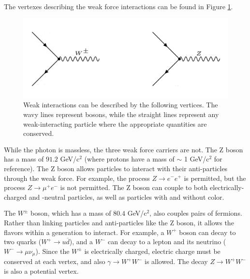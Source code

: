 The vertexes describing the weak force interactions can be found in Figure \ref{Fig:Intro:Vertex3}.
\begin{figure}[h]
    \centering
        \includegraphics[width=\textwidth]{F1/Vertex3}
        \caption{Weak interactions can be described by the following vertices. The wavy lines represent bosons, while the straight lines represent any weak-interacting particle where the appropriate quantities are conserved.}
        \label{Fig:Intro:Vertex3}
\end{figure}
While the photon is massless, the three weak force carriers are not. The Z boson has a mass of $91.2$ GeV/c$^2$ (where  protons have a mass of $\sim$ 1 GeV/c$^2$ for reference). The Z boson allows particles to interact with their anti-particles through the weak force. For example, the process $Z\rightarrow e^-e^+$ is permitted, but the process $Z\rightarrow\mu^+e^-$ is not permitted. The Z boson can couple to both electrically-charged and -neutral particles, as well as particles with and without color.

The $W^\pm$ boson, which has a mass of $80.4$ GeV/c$^2$, also couples pairs of fermions. Rather than linking particles and anti-particles like the Z boson, it allows the flavors within a generation to interact. For example, a $W^{+}$ boson can decay to two quarks ($W^{+}\rightarrow u\overline{d}$), and a $W^{-}$ can decay to a lepton and its neutrino ($W^{-}\rightarrow\mu\nu_\mu$). Since the $W^{\pm}$ is electrically charged, electric charge must be conserved at each vertex, and also $\gamma\rightarrow W^+W^-$ is allowed. The decay $Z\rightarrow W^+W^-$ is also a potential vertex.


